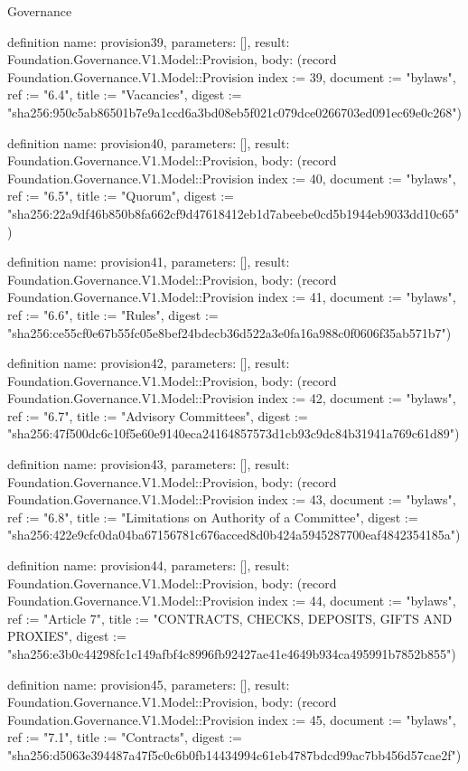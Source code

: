 \begin{lexlean}{Governance}
\begin{semanticmodule}
definition{
  name: provision39,
  parameters: [],
  result: Foundation.Governance.V1.Model::Provision,
  body: (record Foundation.Governance.V1.Model::Provision {index := 39, document := "bylaws", ref := "6.4", title := "Vacancies", digest := "sha256:950c5ab86501b7e9a1ccd6a3bd08eb5f021c079dce0266703ed091ec69e0c268"})
}

definition{
  name: provision40,
  parameters: [],
  result: Foundation.Governance.V1.Model::Provision,
  body: (record Foundation.Governance.V1.Model::Provision {index := 40, document := "bylaws", ref := "6.5", title := "Quorum", digest := "sha256:22a9df46b850b8fa662cf9d47618412eb1d7abeebe0cd5b1944eb9033dd10c65"})
}

definition{
  name: provision41,
  parameters: [],
  result: Foundation.Governance.V1.Model::Provision,
  body: (record Foundation.Governance.V1.Model::Provision {index := 41, document := "bylaws", ref := "6.6", title := "Rules", digest := "sha256:ce55cf0e67b55fc05e8bef24bdecb36d522a3e0fa16a988c0f0606f35ab571b7"})
}

definition{
  name: provision42,
  parameters: [],
  result: Foundation.Governance.V1.Model::Provision,
  body: (record Foundation.Governance.V1.Model::Provision {index := 42, document := "bylaws", ref := "6.7", title := "Advisory Committees", digest := "sha256:47f500dc6c10f5e60e9140eca24164857573d1cb93c9dc84b31941a769c61d89"})
}

definition{
  name: provision43,
  parameters: [],
  result: Foundation.Governance.V1.Model::Provision,
  body: (record Foundation.Governance.V1.Model::Provision {index := 43, document := "bylaws", ref := "6.8", title := "Limitations on Authority of a Committee", digest := "sha256:422e9cfc0da04ba67156781c676acced8d0b424a5945287700eaf4842354185a"})
}

definition{
  name: provision44,
  parameters: [],
  result: Foundation.Governance.V1.Model::Provision,
  body: (record Foundation.Governance.V1.Model::Provision {index := 44, document := "bylaws", ref := "Article 7", title := "CONTRACTS, CHECKS, DEPOSITS, GIFTS AND PROXIES", digest := "sha256:e3b0c44298fc1c149afbf4c8996fb92427ae41e4649b934ca495991b7852b855"})
}

definition{
  name: provision45,
  parameters: [],
  result: Foundation.Governance.V1.Model::Provision,
  body: (record Foundation.Governance.V1.Model::Provision {index := 45, document := "bylaws", ref := "7.1", title := "Contracts", digest := "sha256:d5063e394487a47f5c0c6b0fb14434994c61eb4787bdcd99ac7bb456d57cae2f"})
}


\end{semanticmodule}
\end{lexlean}
